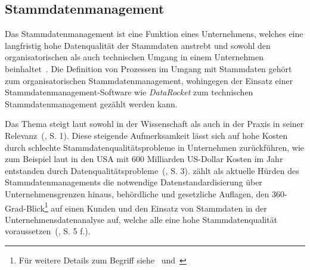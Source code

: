 \documentclass[
  language=german, %
  type=bachelor,%
  ngerman
]{isthesis}
\begin{document}
\begin{content}



  \section{Stammdatenmanagement}
	Das Stammdatenmanagement ist eine Funktion eines Unternehmens, welches eine
	langfristig hohe Datenqualität der Stammdaten anstrebt und sowohl den
	organisatorischen als auch technischen Umgang in einem Unternehmen
	beinhaltet~\cite[][S.  2]{legner2007stammdaten}.  Die Definition von
	Prozessen im Umgang mit Stammdaten gehört \zB{} zum organisatorischen
	Stammdatenmanagement, wohingegen der Einsatz einer Stammdatenmanagement-Software
	wie \textit{DataRocket} zum technischen Stammdatenmanagement gezählt werden
	kann.  

  Das Thema steigt laut \textsc{\citeauthor{otto2012design}} sowohl in der
  Wissenschaft als auch in der Praxis in seiner
  Relevanz~(\citeyear{otto2012design}, S. 1). Diese steigende Aufmerksamkeit
  lässt sich auf hohe Kosten durch schlechte Stammdatenqualitätsprobleme in
  Unternehmen zurückführen, wie zum Beispiel laut
  \textsc{\citeauthor{eckerson2002data}} in den USA mit 600 Milliarden
  US-Dollar Kosten im Jahr entstanden durch
  Datenqualitätsprobleme~(\cite{eckerson2002data}, S. 3).
  \textsc{\citeauthor{otto2011stammdatenmanagement}} zählt als aktuelle Hürden
  des Stammdatenmanagements die notwendige Datenstandardisierung über
  Unternehmensgrenzen hinaus, behördliche und gesetzliche Auflagen, den
  360-Grad-Blick\footnote{Für weitere Details zum Begriff
  siehe~\cite{kotorov2003customer} und~\cite{otto2016master}} auf einen Kunden
  und den Einsatz von Stammdaten in der Unternehmensdatenanalyse auf, welche
  alle eine hohe Stammdatenqualität
  voraussetzen~(\citeyear{otto2011stammdatenmanagement}, S. 5 f.).


\end{content}
\end{document}
